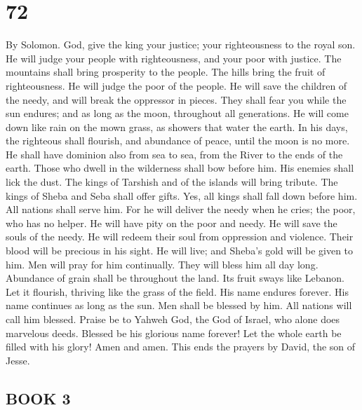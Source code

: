 \hypertarget{section-70}{%
\section{72}\label{section-70}}

By Solomon.  God, give the king your justice; your
righteousness to the royal son.  He will judge your people
with righteousness, and your poor with justice.  The
mountains shall bring prosperity to the people. The hills bring the
fruit of righteousness.  He will judge the poor of the
people. He will save the children of the needy, and will break the
oppressor in pieces.  They shall fear you while the sun
endures; and as long as the moon, throughout all generations.
 He will come down like rain on the mown grass, as showers
that water the earth.  In his days, the righteous shall
flourish, and abundance of peace, until the moon is no more.
 He shall have dominion also from sea to sea, from the
River to the ends of the earth.  Those who dwell in the
wilderness shall bow before him. His enemies shall lick the dust.
 The kings of Tarshish and of the islands will bring
tribute. The kings of Sheba and Seba shall offer gifts. 
Yes, all kings shall fall down before him. All nations shall serve him.
 For he will deliver the needy when he cries; the poor,
who has no helper.  He will have pity on the poor and
needy. He will save the souls of the needy.  He will
redeem their soul from oppression and violence. Their blood will be
precious in his sight.  He will live; and Sheba's gold
will be given to him. Men will pray for him continually. They will bless
him all day long.  Abundance of grain shall be throughout
the land. Its fruit sways like Lebanon. Let it flourish, thriving like
the grass of the field.  His name endures forever. His
name continues as long as the sun. Men shall be blessed by him. All
nations will call him blessed.  Praise be to Yahweh God,
the God of Israel, who alone does marvelous deeds. 
Blessed be his glorious name forever! Let the whole earth be filled with
his glory! Amen and amen.  This ends the prayers by
David, the son of Jesse.

\hypertarget{book-3}{%
\subsection{BOOK 3}\label{book-3}}


